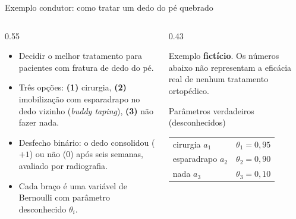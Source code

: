 \documentclass[aspectratio=169, 10pt]{beamer}
\begin{document}
\begin{frame}{Exemplo condutor: como tratar um dedo do pé quebrado}
  \begin{columns}[T]
    \begin{column}{0.55\textwidth}
      \begin{itemize}
        \item Decidir o melhor tratamento para pacientes com fratura de
              dedo do pé.
        \item Três opções: \textbf{(1)} cirurgia, \textbf{(2)}
              imobilização com esparadrapo no dedo vizinho
              (\emph{buddy taping}), \textbf{(3)} não fazer nada.
        \item Desfecho binário: o dedo consolidou (\;$+1$\;) ou não
              (\;$0$\;) após seis semanas, avaliado por radiografia.
        \item Cada braço é uma variável de Bernoulli com parâmetro
              desconhecido $\theta_i$.
      \end{itemize}
    \end{column}
    \begin{column}{0.43\textwidth}
      \begin{alertabox}
        Exemplo \textbf{fictício}. Os números abaixo não representam a
        eficácia real de nenhum tratamento ortopédico.
      \end{alertabox}
      \begin{defbox}{Parâmetros verdadeiros (desconhecidos)}
        \centering\small
        \begin{tabular}{lc}
          cirurgia $a_1$     & $\theta_1 = 0{,}95$ \\
          esparadrapo $a_2$  & $\theta_2 = 0{,}90$ \\
          nada $a_3$         & $\theta_3 = 0{,}10$ \\
        \end{tabular}
      \end{defbox}
    \end{column}
  \end{columns}
\end{frame}
\end{document}

